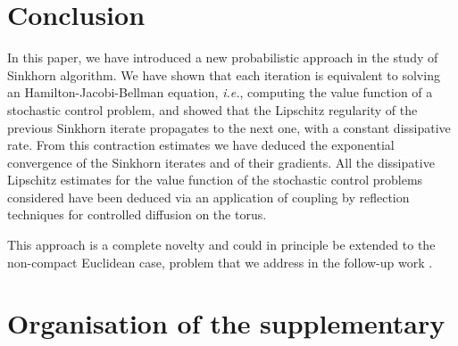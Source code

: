 \documentclass[final,12pt]{colt2023} %
\def\ie{\textit{i.e.}}
\def\ie{\textit{i.e.}}
\begin{document}
\section{Conclusion}\label{sec:conclu}
In this paper, we have introduced a new probabilistic approach in the study of Sinkhorn algorithm. We have shown that each iteration is equivalent to solving an Hamilton-Jacobi-Bellman equation, \ie, computing the value function of a stochastic control problem, and showed that the Lipschitz regularity of the previous Sinkhorn iterate propagates to the next one, with a constant dissipative rate. From this contraction estimates we have deduced the exponential convergence of the Sinkhorn iterates and of their gradients. All the dissipative Lipschitz estimates for the value function of the stochastic control problems considered have been deduced via an application of coupling by reflection techniques for controlled diffusion on the torus.

 This approach is a complete novelty and could in principle be extended to the non-compact Euclidean case, problem that we 
 address in the follow-up work \citep{conforti2023Sinkhorn}.






\newpage
\appendix



\section*{Organisation of the supplementary}
\end{document}
